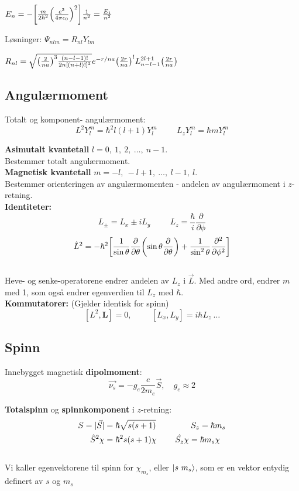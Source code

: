 \documentclass[10p,a4paper]{article}
\renewcommand{\exp}{e^}
\begin{document}
$E_n = -\qty[\frac{m}{2\hbar^2}\qty(\frac{e^2}{4\pi\epsilon_0})^2]\frac{1}{n^2} = \frac{E_1}{n^2}$

Løsninger: $\Psi_{nlm} = R_{nl}Y_{lm}$

$R_{nl} = \sqrt{\qty(\frac{2}{na})^3\frac{(n-l-1)!}{2n[(n+l)!]^3}}\exp{-r/na}\qty(\frac{2r}{na})^l L_{n-l-1}^{2l+1}\qty(\frac{2r}{na})$




\subsection*{Angulærmoment}
Totalt og komponent- angulærmoment:
\[  L^2 Y_l^m = \hbar^2 l(l+1)Y_l^m \hspace{1cm} L_z Y_l^m = \hbar m Y_l^m\]


\textbf{Asimutalt kvantetall} $l = 0,\ 1,\ 2,\ \dots,\ n-1$.\\
Bestemmer totalt angulærmoment. 
\\

\textbf{Magnetisk kvantetall} $m = -l,\ -l+1,\ \dots,\ l-1,\ l$.\\
Bestemmer orienteringen av angulærmomenten - andelen av angulærmoment i $z$-retning.
\\

\textbf{Identiteter:}
\[L_\pm = L_x \pm i L_y \hspace{1cm} L_z = \frac{\hbar}{i}\frac{\partial}{\partial\phi}\]
\[\hat{L}^2 = -\hbar^2\qty[\frac{1}{\sin\theta}\frac{\partial}{\partial\theta}\qty(\sin\theta\frac{\partial}{\partial\theta}) + \frac{1}{\sin^2\theta}\frac{\partial^2}{\partial\phi^2}]\]
\\
Heve- og senke-operatorene endrer andelen av $L_z$ i $\vec{L}$. Med andre ord, endrer $m$ med 1, som også endrer egenverdien til $L_z$ med $\hbar$.
\\

\textbf{Kommutatorer:} (Gjelder identisk for spinn)
\[  [L^2, \textbf{L}] = 0, \hspace{1cm} [L_x, L_y] = i\hbar L_z\ \dots\]




\subsection*{Spinn}

Innebygget magnetisk \textbf{dipolmoment}:
\[ \vec{\nu_s} = -g_e\frac{e}{2m_e}\vec{S},\quad g_e \approx 2\]

\textbf{Totalspinn} og \textbf{spinnkomponent} i $z$-retning:
\begin{align*}
S = |\vec{S}| &= \hbar\sqrt{s(s+1)} \hspace{1.5cm} S_z = \hbar m_s \\
\hat{S}^2\chi &= \hbar^2s(s+1)\chi \hspace{0.8cm} \hat{S_z}\chi = \hbar m_s \chi
\end{align*}
\\
Vi kaller egenvektorene til spinn for $\chi_{m_s}$, eller $\ket{s\ m_s}$, som er en vektor entydig definert av $s$ og $m_s$
\\
\end{document}
